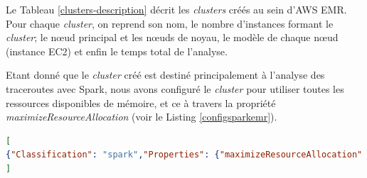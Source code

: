 Le Tableau \ref{clusters-description} décrit les \textit{clusters} créés au sein d'AWS EMR. Pour chaque \textit{cluster}, on reprend son nom, le nombre d'instances formant le \textit{cluster}; le n\oe{}ud principal et  les n\oe{}uds de noyau, le modèle de chaque n\oe{}ud (instance EC2) et enfin le temps total de l'analyse. 

\begin{table}[H]
	\centering
\caption{Description des \textit{clusters} utilisés avec le temps total d'exécution sur les données A}
\label{clusters-description}
\end{table}

Etant donné que le \textit{cluster} créé est destiné principalement à l'analyse des traceroutes avec Spark, nous avons configuré le \textit{cluster} pour utiliser toutes les ressources disponibles de mémoire, et ce à travers la propriété \textit{maximizeResourceAllocation} (voir le Listing \ref{configsparkemr}). 

\begin{lstlisting}[language=json, basicstyle=\small, label= configsparkemr, caption = Exemple du fichier de configuration d'un cluster Amazon EMR]
[
{"Classification": "spark","Properties": {"maximizeResourceAllocation": "true"} }
]
\end{lstlisting}




